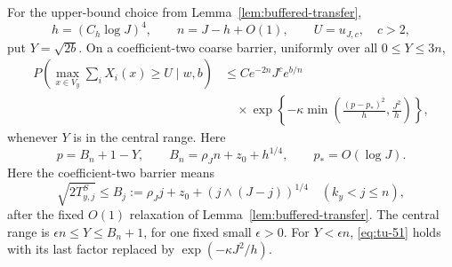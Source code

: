 \begin{lemma}
For the upper-bound choice from Lemma~\ref{lem:buffered-transfer},
\[
 h=(C_h\log J)^4,\qquad n=J-h+O(1),\qquad
 U=u_{J,c},\quad c>2,
\]
put \(Y=\sqrt{2b}\).  On a coefficient-two coarse barrier, uniformly over
all \(0\le Y\le 3n\),
\begin{equation}
\begin{split}
 P\left(\max_{x\in V_y}\sum_iX_i(x)\ge U\mid w,b\right)
 &\le C e^{-2n}J^c e^{b/n}\\
 &\quad{}\times
 \exp\left\{-\kappa\min\left(
 \frac{(p-p_*)^2}{h},\frac{J^2}{h}\right)\right\},            \end{split}
\tag{51}\label{eq:tu-51}
\end{equation}
whenever \(Y\) is in the central range.  Here
\[
 p=B_n+1-Y,\qquad B_n=\rho_Jn+z_0+h^{1/4},\qquad
 p_*=O(\log J).
\]
Here the coefficient-two barrier means
\begin{equation}
 \sqrt{2T^S_{y,j}}\le
 B_j:=\rho_Jj+z_0+(j\wedge(J-j))^{1/4}
 \quad(k_y<j\le n),                                         \tag{52}\label{eq:tu-52}
\end{equation}
after the fixed \(O(1)\) relaxation of Lemma~\ref{lem:buffered-transfer}.  The central range is
\(\epsilon n\le Y\le B_n+1\), for one fixed small
\(\epsilon>0\).  For \(Y<\epsilon n\), \eqref{eq:tu-51} holds with its last factor
replaced by \(\exp(-\kappa J^2/h)\).
\end{lemma}

